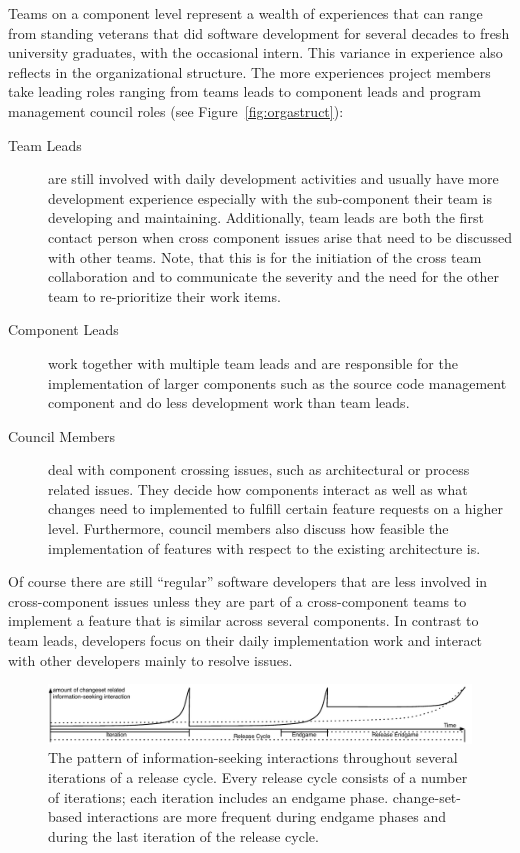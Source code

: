 Teams on a component level represent a wealth of experiences that can range from standing veterans that did software development for several decades to fresh university graduates, with the occasional intern.
This variance in experience also reflects in the organizational structure.
The more experiences project members take leading roles ranging from teams leads to component leads and program management council roles (see Figure~\ref{fig:orgastruct}):
\begin{description}
\item[Team Leads] are still involved with daily development activities and usually have more development experience especially with the sub-component their team is developing and maintaining.
Additionally, team leads are both the first contact person when cross component issues arise that need to be discussed with other teams.
Note, that this is for the initiation of the cross team collaboration and to communicate the severity and the need for the other team to re-prioritize their work items.
\item[Component Leads] work together with multiple team leads and are responsible for the implementation of larger components such as the source code management component and do less development work than team leads.
\item[Council Members] deal with component crossing issues, such as architectural or process related issues.
They decide how components interact as well as what changes need to implemented to fulfill certain feature requests on a higher level.
Furthermore, council members also discuss how feasible the implementation of features with respect to the existing architecture is.
\end{description}
Of course there are still ``regular'' software developers that are less involved in cross-component issues unless they are part of a cross-component teams to implement a feature that is similar across several components.
In contrast to team leads, developers focus on their daily implementation work and interact with other developers mainly to resolve issues.

\begin{figure}[t]
\centering
\includegraphics[width=\textwidth]{figures/findingProcess2}
\vspace{-20pt}\caption{The pattern of information-seeking interactions throughout several iterations of a release cycle. Every release cycle consists of a number of iterations; each iteration includes an endgame phase. change-set-based interactions are more frequent during endgame phases and during the last iteration of the release cycle.}
\label{IterationsFig1}
\end{figure}

